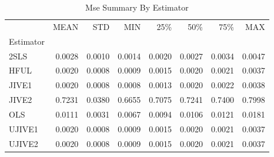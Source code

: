 \begin{table}[ht]
\centering
\caption{Mse Summary By Estimator}
\begin{tabular}{lrrrrrrr}
\toprule
 & MEAN & STD & MIN & 25\% & 50\% & 75\% & MAX \\
Estimator &  &  &  &  &  &  &  \\
\midrule
2SLS & 0.0028 & 0.0010 & 0.0014 & 0.0020 & 0.0027 & 0.0034 & 0.0047 \\
HFUL & 0.0020 & 0.0008 & 0.0009 & 0.0015 & 0.0020 & 0.0021 & 0.0037 \\
JIVE1 & 0.0020 & 0.0008 & 0.0008 & 0.0013 & 0.0020 & 0.0022 & 0.0038 \\
JIVE2 & 0.7231 & 0.0380 & 0.6655 & 0.7075 & 0.7241 & 0.7400 & 0.7998 \\
OLS & 0.0111 & 0.0031 & 0.0067 & 0.0094 & 0.0106 & 0.0121 & 0.0181 \\
UJIVE1 & 0.0020 & 0.0008 & 0.0009 & 0.0015 & 0.0020 & 0.0021 & 0.0037 \\
UJIVE2 & 0.0020 & 0.0008 & 0.0009 & 0.0015 & 0.0020 & 0.0021 & 0.0037 \\
\bottomrule
\end{tabular}
\end{table}
